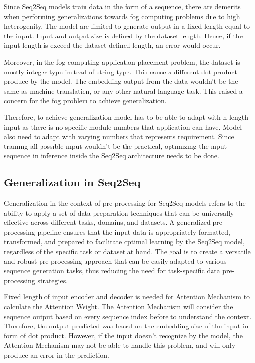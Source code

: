 \documentclass[conference]{IEEEtran}
\begin{document}
Since Seq2Seq models train data in the form of a sequence, there are demerits when performing generalizations towards fog computing problems due to high heterogenity. The model are limited to generate output in a fixed length equal to the input. Input and output size is defined by the dataset length. Hence, if the input length is exceed the dataset defined length, an error would occur. 

Moreover, in the fog computing application placement problem, the dataset is mostly integer type instead of string type. This cause a different dot product produce by the model. The embedding output from the data wouldn't be the same as machine translation, or any other natural language task. This raised a concern for the fog problem to achieve generalization.

Therefore, to achieve generalization model has to be able to adapt with n-length input as there is no specific module numbers that application can have. Model also need to adapt with varying numbers that represents requirement. Since training all possible input wouldn't be the practical, optimizing the input sequence in inference inside the Seq2Seq architecture needs to be done.

\subsection{Generalization in Seq2Seq}

Generalization in the context of pre-processing for Seq2Seq models refers to the ability to apply a set of data preparation techniques that can be universally effective across different tasks, domains, and datasets. A generalized pre-processing pipeline ensures that the input data is appropriately formatted, transformed, and prepared to facilitate optimal learning by the Seq2Seq model, regardless of the specific task or dataset at hand. The goal is to create a versatile and robust pre-processing approach that can be easily adapted to various sequence generation tasks, thus reducing the need for task-specific data pre-processing strategies.


Fixed length of input encoder and decoder is needed for Attention Mechanism to calculate the Attention Weight. The Attention Mechanism will consider the sequence output based on every sequence index before to understand the context. Therefore, the output predicted was based on the embedding size of the input in form of dot product. However, if the input doesn't recognize by the model, the Attention Mechanism may not be able to handle this problem, and will only produce an error in the prediction.
\end{document}
